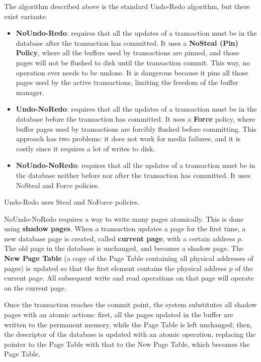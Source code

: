 The algorithm described above is the standard Undo-Redo algorithm, but there exist variants:
\begin{itemize}
    \item \textbf{NoUndo-Redo}: requires that all the updates of a transaction must be in the database after the transaction has committed. It uses a \textbf{NoSteal (Pin) Policy}, where all the buffers used by transactions are pinned, and those pages will not be flushed to disk until the transaction commit. This way, no operation ever needs to be undone. It is dangerous because it pins all those pages used by the active transactions, limiting the freedom of the buffer manager.

    \item \textbf{Undo-NoRedo}: requires that all the updates of a transaction must be in the database before the transaction has committed. It uses a \textbf{Force} policy, where buffer pages used by transactions are forcibly flushed before committing. This approach has two problems: it does not work for media failures, and it is costly since it requires a lot of writes to disk.

    \item \textbf{NoUndo-NoRedo}: requires that all the updates of a transaction must be in the database neither before nor after the transaction has committed. It uses NoSteal and Force policies.
\end{itemize}
Undo-Redo uses Steal and NoForce policies.

NoUndo-NoRedo requires a way to write many pages atomically. This is done using \textbf{shadow pages}. When a transaction updates a page for the first time, a new database page is created, called \textbf{current page}, with a certain address $p$. The old page in the database is unchanged, and becomes a shadow page. The \textbf{New Page Table} (a copy of the Page Table containing all physical addresses of pages) is updated so that the first element contains the physical address $p$ of the current page. All subsequent write and read operations on that page will operate on the current page.

Once the transaction reaches the commit point, the system substitutes all shadow pages with an atomic actions: first, all the pages updated in the buffer are written to the permanent memory, while the Page Table is left unchanged; then, the descriptor of the database is updated with an atomic operation, replacing the pointer to the Page Table with that to the New Page Table, which becomes the Page Table.

